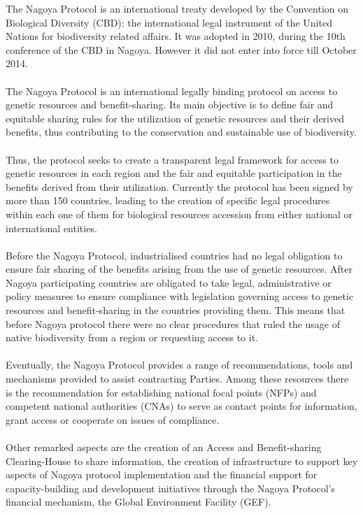 The Nagoya Protocol is an international treaty developed by the Convention on Biological Diversity (CBD): the international legal instrument of the United Nations for biodiversity related affairs. It was adopted in 2010, during the 10th conference of the CBD in Nagoya. However it did not enter into force till October 2014. \\ \\
The Nagoya Protocol is an international legally binding protocol on access to genetic resources and benefit-sharing. Its main objective is to define fair and equitable sharing rules for the utilization of genetic resources and their derived benefits, thus contributing to the conservation and sustainable use of biodiversity. \\ \\ 
Thus, the protocol seeks to create a transparent legal framework for access to genetic resources in each region and the fair and equitable participation in the benefits derived from their utilization. Currently the protocol has been signed by more than 150 countries, leading to the creation of specific legal procedures within each one of them for biological resources accession from either national or international entities. \\ \\
Before the Nagoya Protocol, industrialised countries had no legal obligation to ensure fair sharing of the benefits arising from the use of genetic resources. After Nagoya participating countries are obligated to take legal, administrative or policy measures to ensure compliance with legislation governing access to genetic resources and benefit-sharing in the countries providing them. This means that before Nagoya protocol there were no clear procedures that ruled the usage of native biodiversity from a region or requesting access to it. \\ \\
Eventually, the Nagoya Protocol provides a range of recommendations, tools and mechanisms provided to assist contracting Parties. Among these resources there is the recommendation for  establishing national focal points (NFPs) and competent national authorities (CNAs) to serve as contact points for information, grant access or cooperate on issues of compliance.  \\ \\
Other remarked aspects are the creation of an Access and Benefit-sharing Clearing-House to share information, the creation of infrastructure to support key aspects of Nagoya protocol implementation and the financial support for capacity-building and development initiatives through the Nagoya Protocol’s financial mechanism, the Global Environment Facility (GEF). \\ \\
